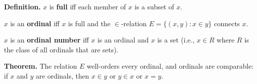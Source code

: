 \textbf{Definition.} $x$ is \textbf{full} iff each member of $x$ is a subset of $x$.

$x$ is an \textbf{ordinal} iff $x$ is full and the $\in$-relation $E = \{(x,y) : x \in y\}$ connects $x$.

$x$ is an \textbf{ordinal number} iff $x$ is an ordinal and $x$ is a set (i.e., $x \in R$ where $R$ is the class of all ordinals that are sets).

\textbf{Theorem.} The relation $E$ well-orders every ordinal, and ordinals are comparable: if $x$ and $y$ are ordinals, then $x \in y$ or $y \in x$ or $x = y$.
